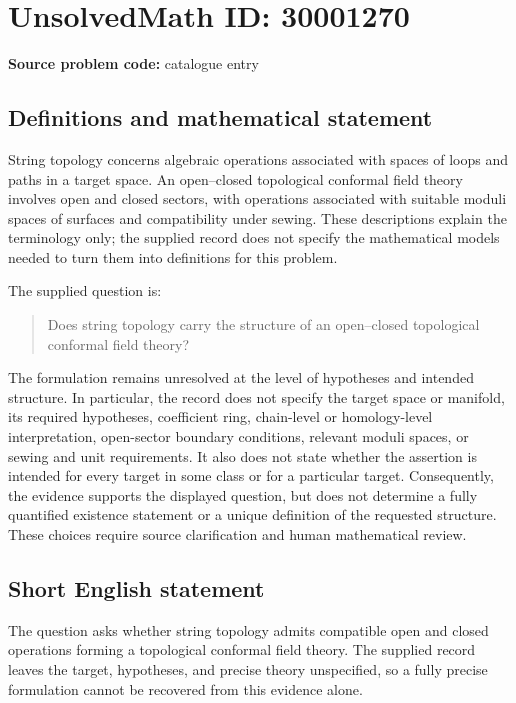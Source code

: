 \documentclass[11pt]{article}
\begin{document}
\section*{UnsolvedMath ID: 30001270}
\textbf{Source problem code:} catalogue entry
\subsection{Definitions and mathematical statement}
String topology concerns algebraic operations associated with spaces of loops and paths in a target space. An open--closed topological conformal field theory involves open and closed sectors, with operations associated with suitable moduli spaces of surfaces and compatibility under sewing. These descriptions explain the terminology only; the supplied record does not specify the mathematical models needed to turn them into definitions for this problem.

The supplied question is:
\begin{quote}
Does string topology carry the structure of an open--closed topological conformal field theory?
\end{quote}

The formulation remains unresolved at the level of hypotheses and intended structure. In particular, the record does not specify the target space or manifold, its required hypotheses, coefficient ring, chain-level or homology-level interpretation, open-sector boundary conditions, relevant moduli spaces, or sewing and unit requirements. It also does not state whether the assertion is intended for every target in some class or for a particular target. Consequently, the evidence supports the displayed question, but does not determine a fully quantified existence statement or a unique definition of the requested structure. These choices require source clarification and human mathematical review.
\subsection{Short English statement}
The question asks whether string topology admits compatible open and closed operations forming a topological conformal field theory. The supplied record leaves the target, hypotheses, and precise theory unspecified, so a fully precise formulation cannot be recovered from this evidence alone.
\end{document}
